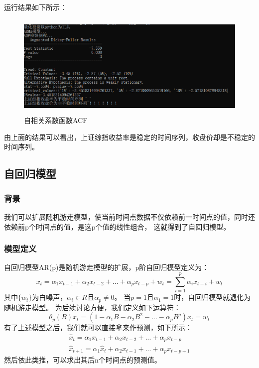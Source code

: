\documentclass{article}
\begin{document}
运行结果如下所示：
\begin{figure}[H]
	\caption{自相关系数函数ACF}
	\label{f000022}
	\centering
	\includegraphics[height=5cm]{images/f000022}
\end{figure}
由上面的结果可以看出，上证综指收益率是稳定的时间序列，收盘价却是不稳定的时间序列。
\subsection{自回归模型}
\subsubsection{背景}
我们可以扩展随机游走模型，使当前时间点数据不仅依赖前一时间点的值，同时还依赖前p个时间点的值，是这p个值的线性组合，
这就得到了自回归模型。
\subsubsection{模型定义}
自回归模型AR(p)是随机游走模型的扩展，p阶自回归模型定义为：
\begin{equation}
x_{t}=\alpha _{1}x_{t-1} + \alpha _{2}x_{t-2} + ... + \alpha _{p}x_{t-p} + w_{t} = \sum_{i=1}^{p} \alpha _{i}x_{t-i} + w_{t}
\label{e000025}
\end{equation}
其中$\{ w_{t} \}$为白噪声，$\alpha _{i} \in R$且$\alpha_{p} \ne 0$。\newline
当$p=1$且$\alpha _{1}=1$时，自回归模型就退化为随机游走模型。\newline
为后续讨论方便，我们定义如下运算符：
\begin{equation}
\theta _{p}(B)x_{t}=(1-\alpha _{1}B-\alpha _{2}B^{2}-...-\alpha _{p}B^{p})x_{t}=w_{t}
\label{e000026}
\end{equation}
有了上述模型之后，我们就可以直接拿来作预测，如下所示：
\begin{equation}
\begin{aligned}
    \hat{x}_t=\alpha _{1}x_{t-1}+\alpha _{2}x_{t-2}+...+\alpha _{p}x_{t-p} \\
    \hat{x}_{t+1}=\alpha _{1}\hat{x}_{t}+\alpha _{2}x_{t-1}+...+\alpha _{p}x_{t-p+1}
\end{aligned}
\label{e000027}
\end{equation}
然后依此类推，可以求出其后n个时间点的预测值。
\end{document}

